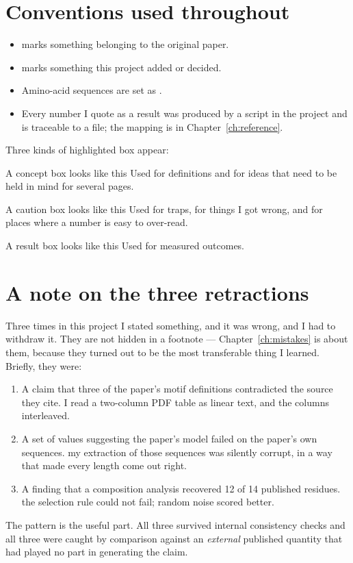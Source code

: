 \section{Conventions used throughout}

\begin{itemize}[leftmargin=*,itemsep=2pt]
  \item {} marks something belonging to the original paper.
  \item {} marks something this project added or decided.
  \item Amino-acid sequences are set as .
  \item Every number I quote as a result was produced by a script in the
        project and is traceable to a file; the mapping is in
        Chapter~\ref{ch:reference}.
\end{itemize}

Three kinds of highlighted box appear:

\begin{keybox}{A concept box looks like this}
Used for definitions and for ideas that need to be held in mind for several
pages.
\end{keybox}

\begin{warnbox}{A caution box looks like this}
Used for traps, for things I got wrong, and for places where a number is easy
to over-read.
\end{warnbox}

\begin{goodbox}{A result box looks like this}
Used for measured outcomes.
\end{goodbox}

\section{A note on the three retractions}

Three times in this project I stated something, and it was wrong, and I had to
withdraw it. They are not hidden in a footnote --- Chapter~\ref{ch:mistakes} is
about them, because they turned out to be the most transferable thing I
learned. Briefly, they were:

\begin{enumerate}[leftmargin=*,itemsep=3pt]
  \item A claim that three of the paper's motif definitions contradicted the
        source they cite.  I read a two-column PDF table as
        linear text, and the columns interleaved.
  \item A set of \Rsq{} values suggesting the paper's model failed on the
        paper's own sequences.  my extraction of those sequences
        was silently corrupt, in a way that made every length come out right.
  \item A finding that a composition analysis recovered 12 of 14 published
        residues.  the selection rule could not fail; random
        noise scored better.
\end{enumerate}

The pattern is the useful part. All three survived internal consistency
checks and all three were caught by comparison against an \emph{external}
published quantity that had played no part in generating the claim.
